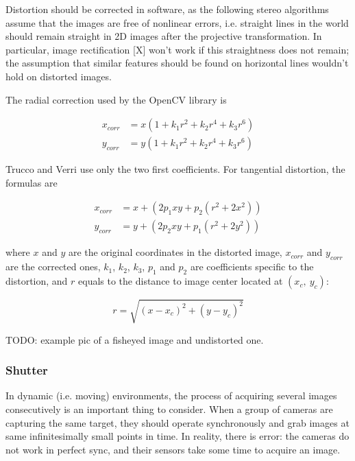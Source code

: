 

Distortion should be corrected in software, as the following stereo algorithms assume that the images are free of nonlinear errors, i.e. straight lines in the world should remain straight in 2D images after the projective transformation.
In particular, image rectification [X] won't work if this straightness does not remain; the assumption that similar features should be found on horizontal lines wouldn't hold on distorted images.

The radial correction used by the OpenCV library is

\begin{align}
	x_{corr} &= x(1 + k_1 r^2 + k_2 r^4 + k_3 r^6)\\
	y_{corr} &= y(1 + k_1 r^2 + k_2 r^4 + k_3 r^6)
\end{align}

Trucco and Verri \cite{trucco1998introductory} use only the two first coefficients. For tangential distortion, the formulas are

\begin{align}
x_{corr} &= x + (2 p_1 x y + p_2 (r^2 + 2 x^2))\\
y_{corr} &= y + (2 p_2 x y + p_1 (r^2 + 2 y^2))
\end{align}

where $x$ and $y$ are the original coordinates in the distorted image, $x_{corr}$ and $y_{corr}$ are the corrected ones, $k_1$, $k_2$, $k_3$, $p_1$ and $p_2$ are coefficients specific to the distortion, and $r$ equals to the distance to image center located at $(x_c,~y_c)$:

\begin{equation}
r = \sqrt{(x - x_c)^2 + (y - y_c)^2}
\end{equation}

TODO: example pic of a fisheyed image and undistorted one.

\subsubsection{Shutter}

In dynamic (i.e. moving) environments, the process of acquiring several images consecutively is an important thing to consider. When a group of cameras are capturing the same target, they should operate synchronously and grab images at same infinitesimally small points in time. In reality, there is error: the cameras do not work in perfect sync, and their sensors take some time to acquire an image.

